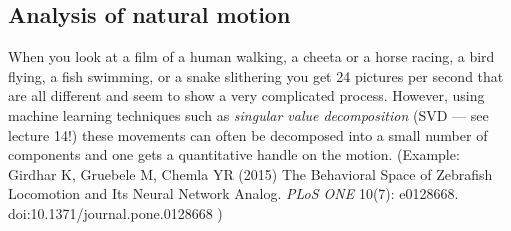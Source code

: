\documentclass[letterpaper]{scrartcl}
\begin{document}




\subsection{Analysis of natural motion}
\label{sec:motion}

When you look at a film of a human walking, a cheeta or a horse
racing, a bird flying, a fish swimming, or a snake slithering you get
24 pictures per second that are all different and seem to show a very
complicated process. However, using machine learning techniques such
as \emph{singular value decomposition} (SVD --- see lecture 14!) these
movements can often be decomposed into a small number of components and
one gets a quantitative handle on the motion. (Example: Girdhar K,
Gruebele M, Chemla YR (2015) The Behavioral Space of Zebrafish
Locomotion and Its Neural Network Analog. \emph{PLoS ONE} 10(7):
e0128668. doi:10.1371/journal.pone.0128668 )
\end{document}
